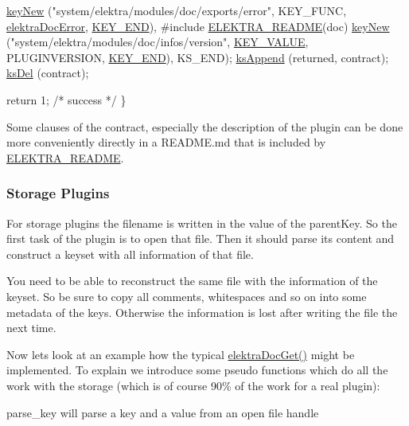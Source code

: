 \begin{DoxyCodeInclude}
                \hyperlink{group__key_gad23c65b44bf48d773759e1f9a4d43b89}{keyNew} (\textcolor{stringliteral}{"system/elektra/modules/doc/exports/error"},
                        KEY\_FUNC, \hyperlink{group__plugin_gad74b35f558ac7c3262f6069c5c47dc79}{elektraDocError}, \hyperlink{group__key_gga91fb3178848bd682000958089abbaf40aa8adb6fcb92dec58fb19410eacfdd403}{KEY\_END}),
#include \hyperlink{group__plugin_ga78d616f68bf9fb0942f66478597467c6}{ELEKTRA\_README}(doc)
                \hyperlink{group__key_gad23c65b44bf48d773759e1f9a4d43b89}{keyNew} (\textcolor{stringliteral}{"system/elektra/modules/doc/infos/version"},
                        \hyperlink{group__key_gga91fb3178848bd682000958089abbaf40ac66e4a49d09212b79f5754ca6db5bd2e}{KEY\_VALUE}, PLUGINVERSION, \hyperlink{group__key_gga91fb3178848bd682000958089abbaf40aa8adb6fcb92dec58fb19410eacfdd403}{KEY\_END}),
                KS\_END);
                \hyperlink{group__keyset_ga21eb9c3a14a604ee3a8bdc779232e7b7}{ksAppend} (returned, contract);
                \hyperlink{group__keyset_ga27e5c16473b02a422238c8d970db7ac8}{ksDel} (contract);

                \textcolor{keywordflow}{return} 1; \textcolor{comment}{/* success */}
        \}
\end{DoxyCodeInclude}
 Some clauses of the contract, especially the description of the plugin can be done more conveniently directly in a R\+E\+A\+D\+M\+E.\+md that is included by \hyperlink{group__plugin_ga78d616f68bf9fb0942f66478597467c6}{E\+L\+E\+K\+T\+R\+A\+\_\+\+R\+E\+A\+D\+M\+E}.\hypertarget{group__plugin_storage}{}\subsubsection{Storage Plugins}\label{group__plugin_storage}
For storage plugins the filename is written in the value of the parent\+Key. So the first task of the plugin is to open that file. Then it should parse its content and construct a keyset with all information of that file.

You need to be able to reconstruct the same file with the information of the keyset. So be sure to copy all comments, whitespaces and so on into some metadata of the keys. Otherwise the information is lost after writing the file the next time.

Now lets look at an example how the typical \hyperlink{group__plugin_gacb69f3441c6d84241b4362f958fbe313}{elektra\+Doc\+Get()} might be implemented. To explain we introduce some pseudo functions which do all the work with the storage (which is of course 90\% of the work for a real plugin)\+:
\begin{DoxyItemize}
\item parse\+\_\+key will parse a key and a value from an open file handle
\end{DoxyItemize}

